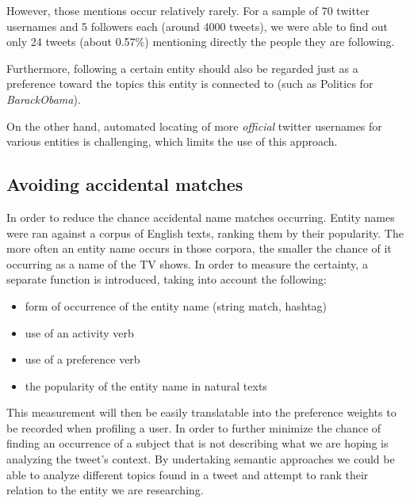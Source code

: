 However, those mentions occur relatively rarely. For a sample of 70 twitter usernames and 5 followers each
(around 4000 tweets), we were able to find out only 24 tweets (about 0.57\%) mentioning directly the people they are following.

Furthermore, following a certain entity should also be regarded just as a preference toward the topics this entity is connected to (such as
Politics for \textit{BarackObama}).

On the other hand, automated locating of more \textit{official} twitter usernames for various entities is challenging, which
limits the use of this approach.

\subsection{Avoiding accidental matches}
In order to reduce the chance accidental name matches occurring. Entity names were ran against a corpus of English texts,
ranking them by their popularity. The more often an entity name occurs in those corpora, the smaller the chance of it occurring as a name of the TV shows. In order to measure the certainty, a separate function is introduced, taking into account the following:

\begin{itemize}
  \item form of occurrence of the entity name (string match, hashtag)
  \item use of an activity verb
  \item use of a preference verb
  \item the popularity of the entity name in natural texts
\end{itemize}

This measurement will then be easily translatable into the preference weights to be recorded when profiling a user.
In order to further minimize the chance of finding an occurrence of a subject that is not describing what we are hoping is analyzing the tweet's context.
By undertaking semantic approaches we could be able to analyze different topics found in a tweet and attempt to rank their relation to the entity we are researching.

